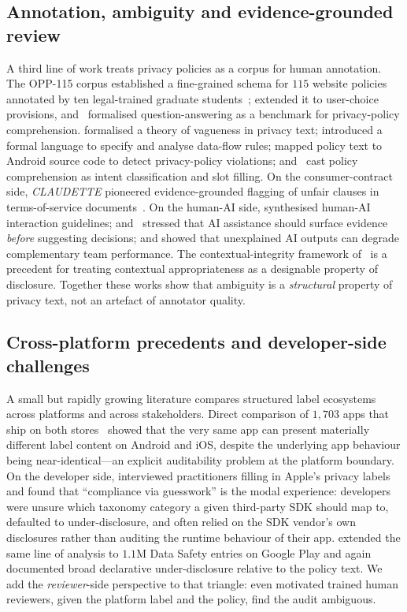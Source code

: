 \documentclass[11pt,a4paper]{article}
\begin{document}
\subsection{Annotation, ambiguity and evidence-grounded review}
A third line of work treats privacy policies as a corpus for human
annotation. The OPP-115 corpus established a fine-grained schema for $115$
website policies annotated by ten legal-trained
graduate students~\citep{wilson2016creation};
\citet{sathyendra2017identifying} extended it to user-choice provisions,
and~\citet{ravichander2019question} formalised question-answering as a
benchmark for privacy-policy comprehension.
\citet{bhatia2016theory} formalised a theory of vagueness in privacy text;
\citet{breaux2014eddy} introduced a formal language to specify and analyse
data-flow rules; \citet{slavin2016toward} mapped policy text to Android
source code to detect privacy-policy violations;
and~\citet{ahmad2021intent} cast policy comprehension as intent
classification and slot filling. On the consumer-contract side,
\emph{CLAUDETTE} pioneered evidence-grounded flagging of unfair clauses in
terms-of-service documents~\citep{lippi2019claudette}. On the human-AI
side, \citet{amershi2019guidelines} synthesised human-AI interaction
guidelines; \citet{cai2019hello} and~\citet{liao2020questioning}
stressed that AI assistance should surface evidence \emph{before}
suggesting decisions; and \citet{bansal2021does} showed that
unexplained AI outputs can degrade complementary team performance.
The contextual-integrity framework
of~\citet{nissenbaum2004privacy} is a precedent for treating contextual
appropriateness as a designable property of disclosure. Together these
works show that ambiguity is a \emph{structural} property of privacy
text, not an artefact of annotator quality.

\subsection{Cross-platform precedents and developer-side challenges}
A small but rapidly growing literature compares structured label
ecosystems across platforms and across stakeholders. Direct comparison
of $1{,}703$ apps that ship on both stores~\citep{khandelwal2023comparing}
showed that the very same app can present materially different label
content on Android and iOS, despite the underlying app behaviour being
near-identical---an explicit auditability problem at the platform
boundary. On the developer side, \citet{li2022understanding} interviewed
practitioners filling in Apple's privacy labels and found that
``compliance via guesswork'' is the modal experience: developers were
unsure which taxonomy category a given third-party SDK should map to,
defaulted to under-disclosure, and often relied on the SDK vendor's
own disclosures rather than auditing the runtime behaviour of their
app. \citet{khandelwal2024unpacking} extended the same line of analysis
to $1.1$M Data Safety entries on Google Play and again documented broad
declarative under-disclosure relative to the policy text. We add the
\emph{reviewer}-side perspective to that triangle: even motivated
trained human reviewers, given the platform label and the policy, find
the audit ambiguous.
\end{document}
